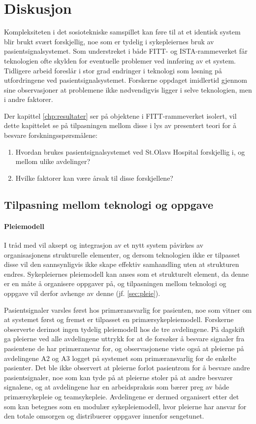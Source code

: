 \chapter{Diskusjon}
\label{chp:diskusjon}
Kompleksiteten i det sosiotekniske samspillet kan føre til at et identisk system blir brukt svært forskjellig, noe som er tydelig i sykepleiernes bruk av pasientsignalsystemet. Som understreket i både FITT- og ISTA-rammeverket får teknologien ofte skylden for eventuelle problemer ved innføring av et system. Tidligere arbeid foreslår i stor grad endringer i teknologi som løsning på utfordringene ved pasientsignalsystemet. Forskerne oppdaget imidlertid gjennom sine observasjoner at problemene ikke nødvendigvis ligger i selve teknologien, men i andre faktorer. 

\noindent
Der kapittel \ref{chp:resultater} ser på objektene i FITT-rammeverket isolert, vil dette kapittelet se på tilpasningen mellom disse i lys av presentert teori for å besvare forskningsspørsmålene:

\begin{enumerate}
\item Hvordan brukes pasientsignalsystemet ved St.Olavs Hospital forskjellig i, og mellom ulike avdelinger? 
\item Hvilke faktorer kan være årsak til disse forskjellene?
\end{enumerate}

\section{Tilpasning mellom teknologi og oppgave}	

\subsubsection{Pleiemodell}	
I tråd med \citet{Orlikowski92} vil aksept og integrasjon av et nytt system påvirkes av organisasjonens strukturelle elementer, og dersom teknologien ikke er tilpasset disse vil den sannsynligvis ikke skape effektiv samhandling uten at strukturen endres. Sykepleiernes pleiemodell kan anses som et strukturelt element, da denne er en måte å organisere oppgaver på, og tilpasningen mellom teknologi og oppgave vil derfor avhenge av denne (jf. \ref{sec:pleie}).

\noindent
Pasientsignaler varsles først hos primæransvarlig for pasienten, noe som vitner om at systemet først og fremst er tilpasset en primærsykepleiemodell. Forskerne observerte derimot ingen tydelig pleiemodell hos de tre avdelingene. På dagskift ga pleierne ved alle avdelingene uttrykk for at de forsøker å besvare signaler fra pasientene de har primæransvar for, og observasjonene viste også at pleierne på avdelingene A2 og A3 logget på systemet som primæransvarlig for de enkelte pasienter. Det ble ikke observert at pleierne forlot pasientrom for å besvare andre pasientsignaler, noe som kan tyde på at pleierne stoler på at andre besvarer signalene, og at avdelingene har en arbeidspraksis som bærer preg av både primærsykepleie og teamsykepleie. Avdelingene er dermed organisert etter det som kan betegnes som en modulær sykepleiemodell, hvor pleierne har ansvar for den totale omsorgen og distribuerer oppgaver innenfor sengetunet.

